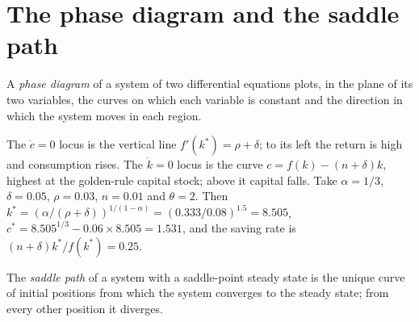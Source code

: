 \section{The phase diagram and the saddle path}\label{sec:b2:ramsey-model:phase}

\begin{definition}\label{def:b2:ramsey-model:phase-diagram}
A \emph{phase diagram} of a system of two differential equations plots, in the plane of its two
variables, the curves on which each variable is constant and the direction in which the system moves in each region.
\end{definition}

The $\dot c = 0$ locus is the vertical line $f'(k^*) = \rho + \delta$; to its left the return is high and consumption rises. The $\dot k = 0$ locus is the curve $c = f(k) - (n + \delta)k$, highest at the
golden-rule capital stock; above it capital falls. Take $\alpha = 1/3$, $\delta = 0.05$, $\rho = 0.03$, $n = 0.01$ and $\theta = 2$. Then $k^* = (\alpha/(\rho + \delta))^{1/(1-\alpha)} = (0.333/0.08)^{1.5} = 8.505$, $c^* = 8.505^{1/3} - 0.06 \times 8.505 = 1.531$, and the saving rate is
$(n + \delta)k^*/f(k^*) = 0.25$.

\begin{definition}\label{def:b2:ramsey-model:saddle-path}
The \emph{saddle path} of a system with a saddle-point steady state is the unique curve of initial
positions from which the system converges to the steady state; from every other position it diverges.
\end{definition}

